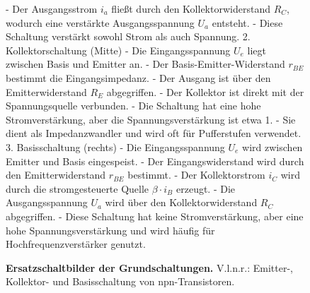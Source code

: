 {\begin{figure}[H]
\begin{minipage}[b]{0.33\textwidth}
{        - Der Ausgangsstrom \( i_a \) fließt durch den Kollektorwiderstand \( R_C \), wodurch eine verstärkte Ausgangsspannung \( U_a \) entsteht.  
        - Diese Schaltung verstärkt sowohl Strom als auch Spannung.  
        2. Kollektorschaltung (Mitte)
        - Die Eingangsspannung \( U_e \) liegt zwischen Basis und Emitter an.  
        - Der Basis-Emitter-Widerstand \( r_{BE} \) bestimmt die Eingangsimpedanz.  
        - Der Ausgang ist über den Emitterwiderstand \( R_E \) abgegriffen.  
        - Der Kollektor ist direkt mit der Spannungsquelle verbunden.  
        - Die Schaltung hat eine hohe Stromverstärkung, aber die Spannungsverstärkung ist etwa 1.  
        - Sie dient als Impedanzwandler und wird oft für Pufferstufen verwendet.  
        3. Basisschaltung (rechts)
        - Die Eingangsspannung \( U_e \) wird zwischen Emitter und Basis eingespeist.  
        - Der Eingangswiderstand wird durch den Emitterwiderstand \( r_{BE} \) bestimmt.  
        - Der Kollektorstrom \( i_C \) wird durch die stromgesteuerte Quelle \( \beta \cdot i_B \) erzeugt.  
        - Die Ausgangsspannung \( U_a \) wird über den Kollektorwiderstand \( R_C \) abgegriffen.  
        - Diese Schaltung hat keine Stromverstärkung, aber eine hohe Spannungsverstärkung und wird häufig für Hochfrequenzverstärker genutzt.}
        \end{minipage}
    \caption{\textbf{Ersatzschaltbilder der Grundschaltungen.} V.l.n.r.: Emitter-, Kollektor- und Basisschaltung von npn-Transistoren.} 
    \label{fig:ErsatzschaltbilderEmitter-Kollektor-UndBasisschaltung}
\end{figure}}



